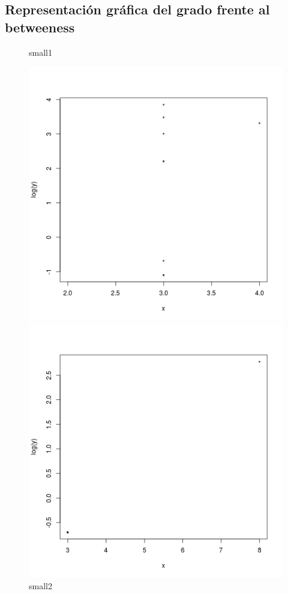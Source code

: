 \documentclass[palatino]{apuntes}
\begin{document}
\newpage
\subsection{Representación gráfica del grado frente al betweeness }


\begin{figure}[h!] 
\centering 
\begin{minipage}[b]{0.4\textwidth}
	\caption{small1}
	\includegraphics[scale=0.45]{img/small1_grado-betweeness}
\end{minipage}
\hfill
\begin{minipage}[b]{0.4\textwidth}
	\caption{small2}
	\includegraphics[scale=0.45]{img/small2_grado-betweeness}
\end{minipage}
\end{figure} 
\end{document}
